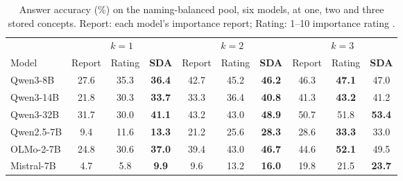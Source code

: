 \begin{table}[t]
\centering
\caption{Answer accuracy (\%) on the naming-balanced pool, six models, at one, two and three stored concepts. Report:
each model's importance report; Rating: 1--10 importance rating
\citep{park2023generative}.}
\label{tab:namingrecall}
\small
\setlength{\tabcolsep}{3.5pt}
\begin{tabular}{lccccccccc}
\toprule
& \multicolumn{3}{c}{$k=1$} & \multicolumn{3}{c}{$k=2$} & \multicolumn{3}{c}{$k=3$} \\
\cmidrule(lr){2-4} \cmidrule(lr){5-7} \cmidrule(lr){8-10}
Model & Report & Rating & \textbf{SDA} & Report & Rating & \textbf{SDA} & Report & Rating & \textbf{SDA} \\
\midrule
Qwen3-8B & 27.6 & 35.3 & \textbf{36.4} & 42.7 & 45.2 & \textbf{46.2} & 46.3 & \textbf{47.1} & 47.0 \\
Qwen3-14B & 21.8 & 30.3 & \textbf{33.7} & 33.3 & 36.4 & \textbf{40.8} & 41.3 & \textbf{43.2} & 41.2 \\
Qwen3-32B & 31.7 & 30.0 & \textbf{41.1} & 43.2 & 43.0 & \textbf{48.9} & 50.7 & 51.8 & \textbf{53.4} \\
Qwen2.5-7B & 9.4 & 11.6 & \textbf{13.3} & 21.2 & 25.6 & \textbf{28.3} & 28.6 & \textbf{33.3} & 33.0 \\
OLMo-2-7B & 24.8 & 30.6 & \textbf{37.0} & 39.4 & 43.0 & \textbf{46.7} & 44.6 & \textbf{52.1} & 49.5 \\
Mistral-7B & 4.7 & 5.8 & \textbf{9.9} & 9.6 & 13.2 & \textbf{16.0} & 19.8 & 21.5 & \textbf{23.7} \\
\bottomrule
\end{tabular}
\end{table}

